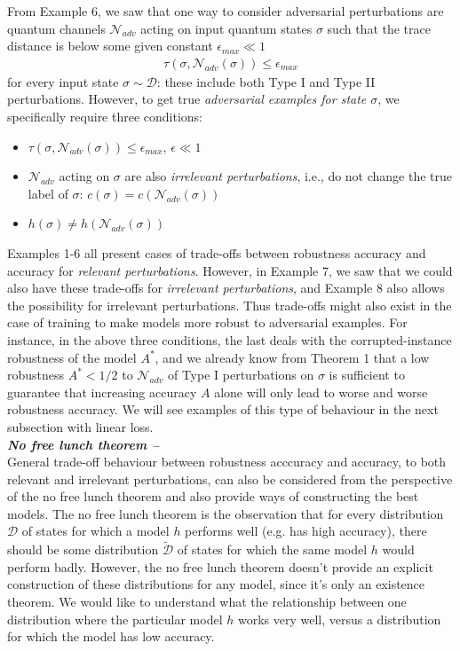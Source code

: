\documentclass[onecolumn,prx, superscriptaddress,longbibliography,margin=1mm 11pt]{revtex4-2}
\begin{document}
\noindent From Example 6, we saw that one way to consider adversarial perturbations are quantum channels $\mathcal{N}_{adv}$ acting on input quantum states $\sigma$ such that the trace distance is below some given constant $\epsilon_{max} \ll 1$
\begin{align}
    \tau(\sigma, \mathcal{N}_{adv}(\sigma)) \leq \epsilon_{max} 
\end{align}
for every input state $\sigma \sim \mathcal{D}$: these include both Type I and Type II perturbations. However, to get true \textit{adversarial examples for state $\sigma$}, we specifically require three conditions:
\begin{itemize}
    \item $\tau(\sigma, \mathcal{N}_{adv}(\sigma)) \leq \epsilon_{max}$, \qquad $\epsilon \ll 1$
    \item $\mathcal{N}_{adv}$ acting on $\sigma$ are also \textit{irrelevant perturbations}, i.e., do not change the true label of $\sigma$: $c(\sigma)=c(\mathcal{N}_{adv}(\sigma))$
    \item $h(\sigma) \neq h(\mathcal{N}_{adv}(\sigma))$
\end{itemize}  
Examples 1-6 all present cases of trade-offs between robustness accuracy and accuracy for \textit{relevant perturbations}. However, in Example 7, we saw that we could also have these trade-offs for \textit{irrelevant perturbations}, and Example 8 also allows the possibility for irrelevant perturbations. Thus trade-offs might also exist in the case of training to make models more robust to adversarial examples. For instance, in the above three conditions, the last deals with the corrupted-instance robustness of the model $A^*$, and we already know from Theorem 1 that a low robustness $A^*<1/2$ to $\mathcal{N}_{adv}$ of Type I perturbations on $\sigma$ is sufficient to guarantee that increasing accuracy $A$ alone will only lead to worse and worse robustness accuracy. We will see examples of this type of behaviour in the next subsection with linear loss. \\

\noindent \textbf{\textit{No free lunch theorem --}}\\

\noindent General trade-off behaviour between robustness acccuracy and accuracy, to both relevant and irrelevant perturbations, can also be considered from the perspective of the no free lunch theorem and also provide ways of constructing the best models. The no free lunch theorem is the observation that for every distribution $\mathcal{D}$ of states for which a model $h$ performs well (e.g. has high accuracy), there should be some distribution $\tilde{\mathcal{D}}$ of states for which the same model $h$ would perform badly. However, the no free lunch theorem doesn't provide an explicit construction of these distributions for any model, since it's only an existence theorem. We would like to understand what the relationship between one distribution where the particular model $h$ works very well, versus a distribution for which the model has low accuracy. 
\end{document}
